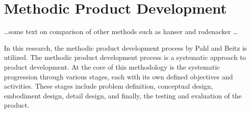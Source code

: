 \chapter{Methodic Product Development}

\dots some text on comparison of other methods such as hanser and rodenacker \dots

In this research, the methodic product development process by Pahl and Beitz \cite{pahl2007engineering} is utilized. The methodic product development process is a systematic approach to product development. At the core of this methodology is the systematic progression through various stages, each with its own defined objectives and activities. These stages include problem definition, conceptual design, embodiment design, detail design, and finally, the testing and evaluation of the product.


